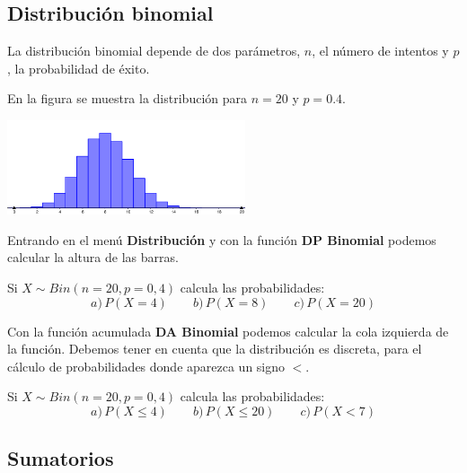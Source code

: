 \documentclass[12pt]{article}
\newenvironment{capitulo}{\begin{tcolorbox}[colback=blue!5!white,colframe=red!75!black]}{\end{tcolorbox}\bigskip}
\newenvironment{ejer}{\begin{tcolorbox}[center title, 
fonttitle=\sffamily\bfseries,colback=blue!5,colframe=orange]}{\end{tcolorbox}}
\begin{document}
\newpage

\begin{capitulo}
\section*{Distribución binomial}
\end{capitulo}

La distribución binomial depende de dos parámetros, $n$, el número de intentos y $p$, la probabilidad de éxito.

En la figura se muestra la distribución para $n=20$ y $p=0.4$.

\begin{center}
\includegraphics[width=7cm]{Binomial.png} 
\end{center}

Entrando en el menú  \textbf{Distribución} y con la función \textbf{DP Binomial} podemos calcular la altura de las barras.

\begin{ejer}

Si $X \sim Bin(n=20, p=0,4)$ calcula las probabilidades:
\[
a)\,P(X=4)\qquad b)\, P(X=8)\qquad c)\, P(X=20)
\]

\end{ejer}

Con la función acumulada \textbf{DA Binomial} podemos calcular la cola izquierda de la función. Debemos tener en cuenta que la distribución es discreta, para el cálculo de probabilidades donde aparezca un signo $<$.

\begin{ejer}

Si $X \sim Bin(n=20, p=0,4)$ calcula las probabilidades:
\[
a)\, P(X \leq 4) \qquad b)\,P(X \leq 20) \qquad c)\, P(X < 7)
\]

\end{ejer}


\newpage

\begin{capitulo}
\section*{Sumatorios}
\end{capitulo}
\end{document}
